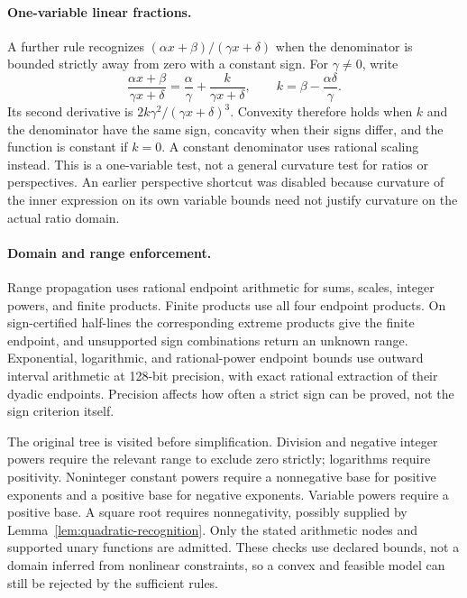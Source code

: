 \paragraph{One-variable linear fractions.}
A further rule recognizes $(\alpha x+\beta)/(\gamma x+\delta)$ when the denominator is bounded strictly away from zero with a constant sign. For $\gamma\ne0$, write
\[
 \frac{\alpha x+\beta}{\gamma x+\delta}
 =\frac{\alpha}{\gamma}+\frac{k}{\gamma x+\delta},\qquad
 k=\beta-\frac{\alpha\delta}{\gamma}.
\]
Its second derivative is $2k\gamma^2/(\gamma x+\delta)^3$. Convexity therefore holds when $k$ and the denominator have the same sign, concavity when their signs differ, and the function is constant if $k=0$. A constant denominator uses rational scaling instead. This is a one-variable test, not a general curvature test for ratios or perspectives. An earlier perspective shortcut was disabled because curvature of the inner expression on its own variable bounds need not justify curvature on the actual ratio domain.

\paragraph{Domain and range enforcement.}
Range propagation uses rational endpoint arithmetic for sums, scales, integer powers, and finite products. Finite products use all four endpoint products. On sign-certified half-lines the corresponding extreme products give the finite endpoint, and unsupported sign combinations return an unknown range. Exponential, logarithmic, and rational-power endpoint bounds use outward interval arithmetic at 128-bit precision, with exact rational extraction of their dyadic endpoints. Precision affects how often a strict sign can be proved, not the sign criterion itself.

The original tree is visited before simplification. Division and negative integer powers require the relevant range to exclude zero strictly; logarithms require positivity. Noninteger constant powers require a nonnegative base for positive exponents and a positive base for negative exponents. Variable powers require a positive base. A square root requires nonnegativity, possibly supplied by Lemma~\ref{lem:quadratic-recognition}. Only the stated arithmetic nodes and supported unary functions are admitted. These checks use declared bounds, not a domain inferred from nonlinear constraints, so a convex and feasible model can still be rejected by the sufficient rules.

